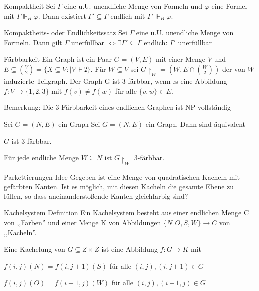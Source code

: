 \documentclass[avery5371]{flashcards}
\begin{document}
\begin{flashcard}[ Kompaktheitsatzes ]{ Kompaktheit }
    Sei $\Gamma$ eine u.U. unendliche Menge von Formeln und $\varphi$ eine Formel mit $\Gamma\Vdash_B\varphi$. Dann existiert $\Gamma'\subseteq\Gamma$ endlich mit $\Gamma'\Vdash_B \varphi$.
\end{flashcard}

\begin{flashcard}[ Kompaktheitsatzes ]{ Kompaktheits- oder Endlichkeitssatz }
    Sei $\Gamma$ eine u.U. unendliche Menge von Formeln. Dann gilt $\Gamma$ unerfüllbar $\Leftrightarrow\exists\Gamma'\subseteq\Gamma$ endlich: $\Gamma'$ unerfüllbar
\end{flashcard}

\begin{flashcard}[ Kompaktheitsatzes ]{ Färbbarkeit }
    Ein Graph ist ein Paar $G=(V,E)$ mit einer Menge $V$
    und $E\subseteq\binom{V}{2} =\{X\subseteq V:|V\Vdash 2 \}$.
    Für $W\subseteq V$ sei $G\upharpoonright_W= (W,E\cap\binom{W}{2})$ der von $W$ induzierte Teilgraph.
    Der Graph G ist 3-färbbar, wenn es eine Abbildung $f:V\rightarrow\{1,2,3\}$ mit $f(v)\not=f(w)$ für alle $\{v,w\}\in E$.

    Bemerkung: Die 3-Färbbarkeit eines endlichen Graphen ist NP-vollständig
\end{flashcard}

\begin{flashcard}[ Kompaktheitsatzes ]{ Sei $G= (N,E)$ ein Graph }
    Sei $G= (N,E)$ ein Graph. Dann sind äquivalent
    \begin{enumerate*}
        \item $G$ ist 3-färbbar.
        \item Für jede endliche Menge $W\subseteq N$ ist $G\upharpoonright_W$ 3-färbbar.
    \end{enumerate*}
\end{flashcard}

\begin{flashcard}[ Kompaktheitsatzes ]{ Parkettierungen Idee }
    Gegeben ist eine Menge von quadratischen Kacheln mit gefärbten Kanten. Ist es möglich, mit diesen Kacheln die gesamte Ebene zu füllen, so dass aneinanderstoßende Kanten gleichfarbig sind?
\end{flashcard}

\begin{flashcard}[ Kompaktheitsatzes ]{ Kachelsystem Definition }
    Ein Kachelsystem besteht aus einer endlichen Menge C von ,,Farben'' und einer Menge K von Abbildungen $\{N,O,S,W\}\rightarrow C$ von ,,Kacheln''.

    Eine Kachelung von $G\subseteq Z\times Z$ ist eine Abbildung $f:G\rightarrow K$ mit
    \begin{itemize*}
        \item $f(i,j)(N) =f(i,j+ 1 )(S)$ für alle $(i,j),(i,j+ 1 )\in G$
        \item $f(i,j)(O) =f(i+ 1 ,j)(W)$ für alle $(i,j),(i+ 1 ,j)\in G$
    \end{itemize*}
\end{flashcard}
\end{document}
